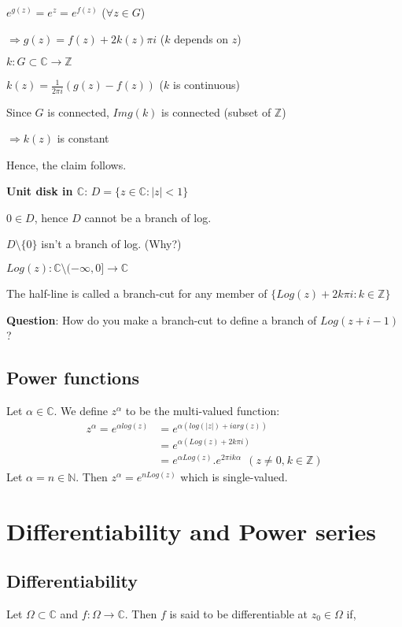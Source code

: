 \documentclass{article}
\begin{document}
\begin{flushleft}
$e^{g(z)}=e^z=e^{f(z)}$ ($\forall z\in G$)

$\Rightarrow g(z)=f(z)+ 2k(z)\pi i$ ($k$ depends on $z$)

$k: G\subset \mathds{C}\rightarrow \mathds{Z}$

$k(z)=\frac{1}{2\pi i}(g(z)-f(z))$ ($k$ is continuous)

Since $G$ is connected, $Img(k)$ is connected  (subset of $\mathds{Z}$)

$\Rightarrow k(z)$ is constant 

Hence, the claim follows.

\textbf{Unit disk in $\mathds{C}$}: $D=\{z\in \mathds{C}: |z|< 1\}$

$0\in D$, hence $D$ cannot be a branch of log. 

$D\setminus \{0\}$ isn't a branch of log. (Why?)

$Log(z): \mathds{C}\setminus (-\infty,0]\rightarrow \mathds{C}$

The half-line is called a branch-cut for any member of $\{Log(z)+2k\pi i: k\in \mathds{Z}\}$

\textbf{Question}: How do you make a branch-cut to define a branch of $Log(z+i-1)$?

\subsection{\textbf{Power functions}}

Let $\alpha \in \mathds{C}$. We define $z^{\alpha}$ to be the multi-valued function:
\begin{align} 
z^{\alpha}=e^{\alpha log(z)}&= e^{\alpha(log(|z|)+ iarg(z))}\nonumber\\
&= e^{\alpha(Log(z)+2k\pi i)}\nonumber\\
&=e^{\alpha Log(z)}.e^{2\pi ik\alpha} \:\:(z\neq 0\text{,} \:k\in \mathds{Z})\nonumber
\end{align}
Let $\alpha=n \in \mathds{N}$. Then $z^{\alpha}=e^{nLog(z)}$ which is single-valued.
\clearpage
\section{Differentiability and Power series}

\subsection{\textbf{Differentiability}} 

Let $\Omega \subset \mathds{C}$ and $f: \Omega \rightarrow \mathds{C}$. Then $f$ is said to be differentiable at $z_0\in \Omega$ if,


\end{flushleft}
\end{document}
